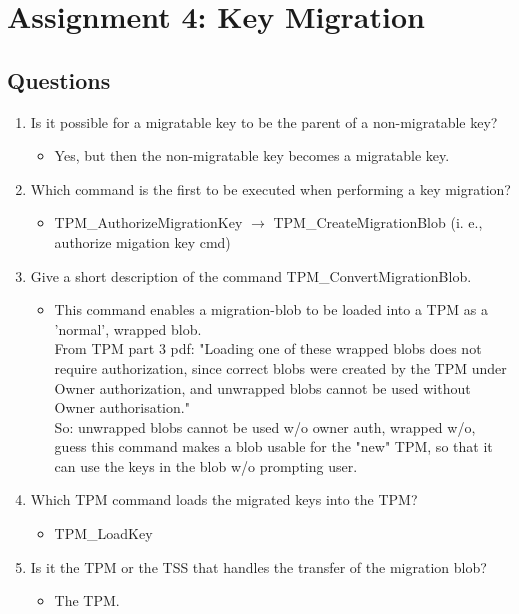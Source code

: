 \documentclass[10pt]{article}
\begin{document}
\section{Assignment 4: Key Migration}
\subsection{Questions}
\begin{enumerate}
    \item {Is it possible for a migratable key to be the parent of a non-migratable key?} 
	\begin{itemize}
	    \item {Yes, but then the non-migratable key becomes a migratable key.}
	\end{itemize}
 
    \item {Which command is the first to be executed when performing a key migration?} 
	\begin{itemize}
	    \item {TPM\_AuthorizeMigrationKey  $\rightarrow$  TPM\_CreateMigrationBlob  (i. e., authorize migation key cmd)}
	\end{itemize}

    \item {Give a short description of the command TPM\_ConvertMigrationBlob.}
	\begin{itemize}
	    \item {This command enables a migration-blob to be loaded into a TPM as a 'normal', wrapped blob.\\
From TPM part 3 pdf: "Loading one of these wrapped blobs does not require authorization, since correct blobs were created by the TPM under Owner authorization, and unwrapped blobs cannot be used without Owner authorisation." \\
So: unwrapped blobs cannot be used w/o owner auth, wrapped w/o, guess this command makes a blob usable for the "new" TPM, so that it can use the keys in the blob w/o prompting user.}
	\end{itemize}

    \item {Which TPM command loads the migrated keys into the TPM?}
	\begin{itemize}
	    \item {TPM\_LoadKey}
	\end{itemize}

    \item {Is it the TPM or the TSS that handles the transfer of the migration blob? }
	\begin{itemize}
	    \item {The TPM.}
	\end{itemize}
\end{enumerate}
\end{document}
